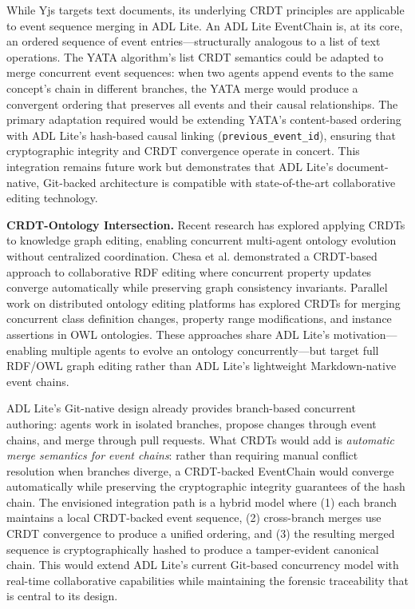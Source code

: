 While Yjs targets text documents, its underlying CRDT principles are applicable to event sequence merging in ADL Lite. An ADL Lite EventChain is, at its core, an ordered sequence of event entries---structurally analogous to a list of text operations. The YATA algorithm's list CRDT semantics could be adapted to merge concurrent event sequences: when two agents append events to the same concept's chain in different branches, the YATA merge would produce a convergent ordering that preserves all events and their causal relationships. The primary adaptation required would be extending YATA's content-based ordering with ADL Lite's hash-based causal linking (\texttt{previous\_event\_id}), ensuring that cryptographic integrity and CRDT convergence operate in concert. This integration remains future work but demonstrates that ADL Lite's document-native, Git-backed architecture is compatible with state-of-the-art collaborative editing technology.

\textbf{CRDT-Ontology Intersection.} Recent research has explored applying CRDTs to knowledge graph editing, enabling concurrent multi-agent ontology evolution without centralized coordination. Chesa et al.\cite{ref59} demonstrated a CRDT-based approach to collaborative RDF editing where concurrent property updates converge automatically while preserving graph consistency invariants. Parallel work on distributed ontology editing platforms\cite{ref60} has explored CRDTs for merging concurrent class definition changes, property range modifications, and instance assertions in OWL ontologies. These approaches share ADL Lite's motivation---enabling multiple agents to evolve an ontology concurrently---but target full RDF/OWL graph editing rather than ADL Lite's lightweight Markdown-native event chains.

ADL Lite's Git-native design already provides branch-based concurrent authoring: agents work in isolated branches, propose changes through event chains, and merge through pull requests. What CRDTs would add is \emph{automatic merge semantics for event chains}: rather than requiring manual conflict resolution when branches diverge, a CRDT-backed EventChain would converge automatically while preserving the cryptographic integrity guarantees of the hash chain. The envisioned integration path is a hybrid model where (1) each branch maintains a local CRDT-backed event sequence, (2) cross-branch merges use CRDT convergence to produce a unified ordering, and (3) the resulting merged sequence is cryptographically hashed to produce a tamper-evident canonical chain. This would extend ADL Lite's current Git-based concurrency model with real-time collaborative capabilities while maintaining the forensic traceability that is central to its design.

